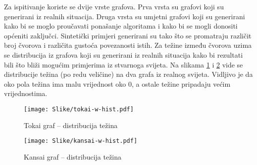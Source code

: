 \documentclass[times, utf8, diplomski, numeric]{fer}
\begin{document}
Za ispitivanje koriste se dvije vrste grafova. Prva vrsta su grafovi koji su generirani iz realnih situacija. Druga vrsta su umjetni grafovi koji su generirani kako bi se moglo proučavati ponašanje algoritama i kako bi se mogli donositi općeniti zaključci. Sintetički primjeri generirani su tako što se promatraju različit broj čvorova i različita gustoća povezanosti istih. Za težine između čvorova uzima se distribucija iz grafova koji su generirani iz realnih situacija kako bi rezultati bili što bliži mogućim primjerima iz stvarnoga svijeta. Na slikama \ref{fig:tokai-hist} i \ref{fig:kansai-hist} vide se distribucije težina (po redu veličine) na dva grafa iz realnog svijeta. Vidljivo je da oko pola težina ima malu vrijednost oko $0$, a ostale težine pripadaju većim vrijednostima.

\begin{figure}[htb]
	\texttt{[image: Slike/tokai-w-hist.pdf]}
	\caption{Tokai graf -- distribucija težina}
	\label{fig:tokai-hist}
\end{figure}


\begin{figure}[htb]
	\texttt{[image: Slike/kansai-w-hist.pdf]}
	\caption{Kansai graf -- distribucija težina}
	\label{fig:kansai-hist}
\end{figure}
\end{document}
